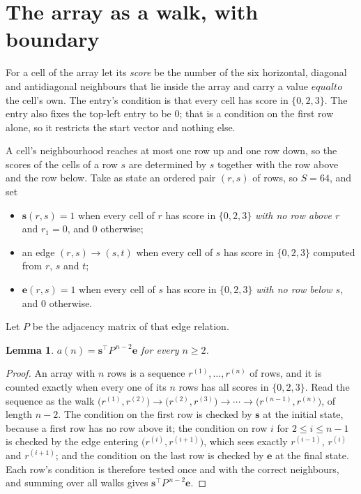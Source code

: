 \documentclass[11pt,a4paper]{article}
\theoremstyle{plain}
\newtheorem{lemma}[theorem]{Lemma}
\theoremstyle{definition}
\begin{document}
\section{The array as a walk, with boundary}

For a cell of the array let its \emph{score} be the number of the six horizontal, diagonal and antidiagonal neighbours that lie inside
the array and carry a value $equal to$ the cell's own. The entry's condition is that every cell
has score in $\{0,2,3\}$. The entry also fixes the top-left entry to be $0$; that is a condition on the first row alone, so it restricts the start vector and nothing else.

A cell's neighbourhood reaches at most one row up and one row down, so the scores of the
cells of a row $s$ are determined by $s$ together with the row above and the row below.
Take as state an ordered pair $(r,s)$ of rows, so $S=64$, and set
\begin{itemize}
\item $\mathbf{s}(r,s)=1$ when every cell of $r$ has score in $\{0,2,3\}$ \emph{with no row
above $r$} and $r_1=0$, and $0$ otherwise;
\item an edge $(r,s)\to(s,t)$ when every cell of $s$ has score in $\{0,2,3\}$ computed from
$r$, $s$ and $t$;
\item $\mathbf{e}(r,s)=1$ when every cell of $s$ has score in $\{0,2,3\}$ \emph{with no row
below $s$}, and $0$ otherwise.
\end{itemize}
Let $P$ be the adjacency matrix of that edge relation.

\begin{lemma}\label{lem:walk}
$a(n)=\mathbf{s}^{\!\top}P^{\,n-2}\mathbf{e}$ for every $n\ge2$.
\end{lemma}

\begin{proof}
An array with $n$ rows is a sequence $r^{(1)},\dots,r^{(n)}$ of rows, and it is counted
exactly when every one of its $n$ rows has all scores in $\{0,2,3\}$. Read the sequence as the
walk $\bigl(r^{(1)},r^{(2)}\bigr)\to\bigl(r^{(2)},r^{(3)}\bigr)\to\cdots\to
\bigl(r^{(n-1)},r^{(n)}\bigr)$, of length $n-2$. The condition on the first row is
checked by $\mathbf{s}$ at the initial state, because a first row has no row above it; the
condition on row $i$ for $2\le i\le n-1$ is checked by the edge entering
$\bigl(r^{(i)},r^{(i+1)}\bigr)$, which sees exactly $r^{(i-1)}$, $r^{(i)}$ and
$r^{(i+1)}$; and the condition on the last row is checked by $\mathbf{e}$ at the final
state. Each row's condition is therefore tested once and with the correct neighbours, and
summing over all walks gives $\mathbf{s}^{\!\top}P^{\,n-2}\mathbf{e}$.
\end{proof}
\end{document}
